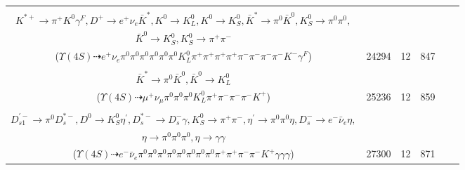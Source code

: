 \documentclass[landscape]{article}
\newcounter{rownumbers}
\newcommand\rn{\stepcounter{rownumbers}\arabic{rownumbers}}
\newcommand{\EOLP}{\\ \hline} %
\newcommand{\topoTags}[1]{#1} %
\begin{document}
\begin{longtable}{clcccc}
\rn & \makecell[l]{ $ 
\Upsilon(4S) \rightarrow B^{0} \bar{B}^{0} ,
B^{0} \rightarrow \pi^{-} K^{*+} ,
\bar{B}^{0} \rightarrow \pi^{0} \rho^{-} \omega K^{-} K^{*+} D^{+} ,
K^{*+} \rightarrow \pi^{+} K^{0} ,
\rho^{-} \rightarrow \pi^{0} \pi^{-} ,
\omega \rightarrow \pi^{0} \pi^{+} \pi^{-} ,
$ \\ $
K^{*+} \rightarrow \pi^{+} K^{0} \gamma^{F} ,
D^{+} \rightarrow e^{+} \nu_{e} \bar{K}^{*} ,
K^{0} \rightarrow K_{L}^{0} ,
K^{0} \rightarrow K_{S}^{0} ,
\bar{K}^{*} \rightarrow \pi^{0} \bar{K}^{0} ,
K_{S}^{0} \rightarrow \pi^{0} \pi^{0} ,
$ \\ $
\bar{K}^{0} \rightarrow K_{S}^{0} ,
K_{S}^{0} \rightarrow \pi^{+} \pi^{-} 
$ \\ ($
\Upsilon(4S) \dashrightarrow e^{+} \nu_{e} \pi^{0} \pi^{0} \pi^{0} \pi^{0} \pi^{0} \pi^{0} K_{L}^{0} \pi^{+} \pi^{+} \pi^{+} \pi^{+} \pi^{-} \pi^{-} \pi^{-} \pi^{-} K^{-} \gamma^{F} 
$) } & \topoTags{24294 & }12 & 847 \EOLP

\rn & \makecell[l]{ $ 
\Upsilon(4S) \rightarrow B^{0} \bar{B}^{0} ,
B^{0} \rightarrow \pi^{-} K^{*+} ,
\bar{B}^{0} \rightarrow \pi^{0} \rho^{0} \pi^{-} D^{+} ,
K^{*+} \rightarrow \pi^{0} K^{+} ,
\rho^{0} \rightarrow \pi^{+} \pi^{-} ,
D^{+} \rightarrow \mu^{+} \nu_{\mu} \bar{K}^{*} ,
$ \\ $
\bar{K}^{*} \rightarrow \pi^{0} \bar{K}^{0} ,
\bar{K}^{0} \rightarrow K_{L}^{0} 
$ \\ ($
\Upsilon(4S) \dashrightarrow \mu^{+} \nu_{\mu} \pi^{0} \pi^{0} \pi^{0} K_{L}^{0} \pi^{+} \pi^{-} \pi^{-} \pi^{-} K^{+} 
$) } & \topoTags{25236 & }12 & 859 \EOLP

\rn & \makecell[l]{ $ 
\Upsilon(4S) \rightarrow B^{0} \bar{B}^{0} ,
B^{0} \rightarrow \rho^{-} K^{*+} ,
\bar{B}^{0} \rightarrow D^{*+} D_{s1}^{\prime-} ,
\rho^{-} \rightarrow \pi^{0} \pi^{-} ,
K^{*+} \rightarrow \pi^{0} K^{+} ,
D^{*+} \rightarrow \pi^{+} D^{0} ,
$ \\ $
D_{s1}^{\prime-} \rightarrow \pi^{0} D_{s}^{*-} ,
D^{0} \rightarrow K_{S}^{0} \eta^{\prime} ,
D_{s}^{*-} \rightarrow D_{s}^{-} \gamma ,
K_{S}^{0} \rightarrow \pi^{+} \pi^{-} ,
\eta^{\prime} \rightarrow \pi^{0} \pi^{0} \eta ,
D_{s}^{-} \rightarrow e^{-} \bar{\nu}_{e} \eta ,
$ \\ $
\eta \rightarrow \pi^{0} \pi^{0} \pi^{0} ,
\eta \rightarrow \gamma \gamma 
$ \\ ($
\Upsilon(4S) \dashrightarrow e^{-} \bar{\nu}_{e} \pi^{0} \pi^{0} \pi^{0} \pi^{0} \pi^{0} \pi^{0} \pi^{0} \pi^{0} \pi^{+} \pi^{+} \pi^{-} \pi^{-} K^{+} \gamma \gamma \gamma 
$) } & \topoTags{27300 & }12 & 871 \EOLP


\end{longtable}
\end{document}
